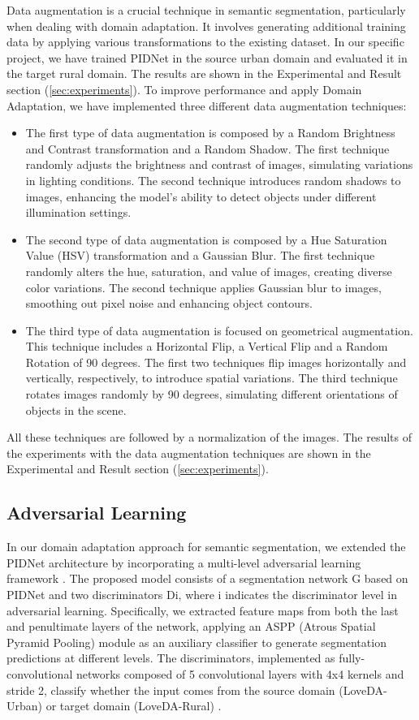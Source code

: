\documentclass[10pt,twocolumn,letterpaper]{article}
\begin{document}
Data augmentation is a crucial technique in semantic segmentation, particularly when dealing with domain adaptation. It involves generating additional training data by applying various transformations to the existing dataset. In our specific project, we have trained PIDNet in the source urban domain and evaluated it in the target rural domain. The results are shown in the Experimental and Result section (\ref{sec:experiments}). 
To improve performance and apply Domain Adaptation, we have implemented three different data augmentation techniques:
\begin{itemize}
    \item The first type of data augmentation is composed by a Random Brightness and Contrast transformation and a Random Shadow. The first technique randomly adjusts the brightness and contrast of images, simulating variations in lighting conditions. The second technique introduces random shadows to images, enhancing the model’s ability to detect objects under different illumination settings. 
    \item The second type of data augmentation is composed by a Hue Saturation Value (HSV) transformation and a Gaussian Blur. The first technique randomly alters the hue, saturation, and value of images, creating diverse color variations. The second technique applies Gaussian blur to images, smoothing out pixel noise and enhancing object contours.
    \item The third type of data augmentation is focused on geometrical augmentation. This technique includes a Horizontal Flip, a Vertical Flip and a Random Rotation of 90 degrees. The first two techniques flip images horizontally and vertically, respectively, to introduce spatial variations. The third technique rotates images randomly by 90 degrees, simulating different orientations of objects in the scene.
\end{itemize}

All these techniques are followed by a normalization of the images. The results of the experiments with the data augmentation techniques are shown in the Experimental and Result section (\ref{sec:experiments}).

\subsection{Adversarial Learning}
In our domain adaptation approach for semantic segmentation, we extended the PIDNet \cite{feng2021pidnet} architecture by incorporating a multi-level adversarial learning framework \cite{tsai2018advlearning}. The proposed model consists of a segmentation network G based on PIDNet and two discriminators Di, where i indicates the discriminator level in adversarial learning. Specifically, we extracted feature maps from both the last and penultimate layers of the network, applying an ASPP (Atrous Spatial Pyramid Pooling) module as an auxiliary classifier to generate segmentation predictions at different levels. The discriminators, implemented as fully-convolutional networks composed of 5 convolutional layers with 4x4 kernels and stride 2, classify whether the input comes from the source domain (LoveDA-Urban) or target domain (LoveDA-Rural) \cite{wang2021loveda}.
\end{document}
